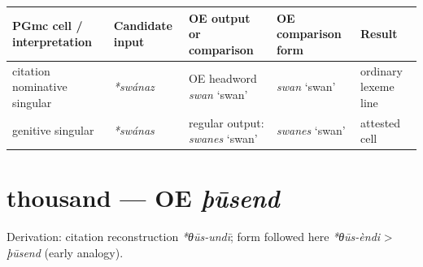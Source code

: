 \documentclass[
  british,
  a4paper,
  openany]{book}
\newcounter{none} %
\providecommand{\texorpdfstring}[2]{#1}
\begin{document}
{\def\LTcaptype{none} %
\begin{longtable}[]{@{}
  >{\raggedright\arraybackslash}p{}
  >{\raggedright\arraybackslash}p{}
  >{\raggedright\arraybackslash}p{}
  >{\raggedright\arraybackslash}p{}
  >{\raggedright\arraybackslash}p{}@{}}
\toprule\noalign{}
\begin{minipage}[b]{\linewidth}\raggedright
PGmc cell / interpretation
\end{minipage} & \begin{minipage}[b]{\linewidth}\raggedright
Candidate input
\end{minipage} & \begin{minipage}[b]{\linewidth}\raggedright
OE output or comparison
\end{minipage} & \begin{minipage}[b]{\linewidth}\raggedright
OE comparison form
\end{minipage} & \begin{minipage}[b]{\linewidth}\raggedright
Result
\end{minipage} \\
\midrule\noalign{}
\endhead
\bottomrule\noalign{}
\endlastfoot
citation nominative singular & {\emph{*swánaz}} & OE headword
{\emph{swan}} `swan' & {\emph{swan}} `swan' & ordinary lexeme line \\
genitive singular & {\emph{*swánas}} & regular output: {\emph{swanes}}
`swan' & {\emph{swanes}} `swan' & attested cell \\
\end{longtable}
}

\section{\texorpdfstring{thousand --- OE
\emph{þūsend}}{thousand --- OE þūsend}}\label{thousand-oe-uxfeux16bsend}


Derivation: citation reconstruction \emph{*θūs-undī}; form followed here
\emph{*θūs-èndi} \textgreater{} \emph{þūsend} (early analogy).
\end{document}
